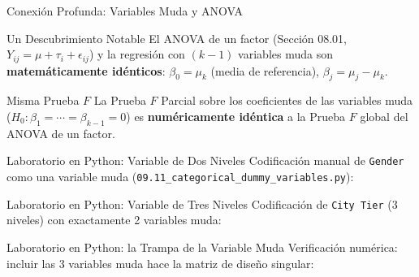 \documentclass[10pt, aspectratio=169]{beamer}
\begin{document}
\begin{frame}{Conexión Profunda: Variables Muda y ANOVA}
  \footnotesize
  \begin{block}{Un Descubrimiento Notable}
    El ANOVA de un factor (Sección 08.01, $Y_{ij}=\mu+\tau_i+\epsilon_{ij}$) y la regresión con $(k-1)$ variables muda son \textbf{matemáticamente idénticos}: $\beta_0=\mu_k$ (media de referencia), $\beta_j=\mu_j-\mu_k$.
  \end{block}
  \pause

  \vspace{0.1cm}
  \begin{alertblock}{Misma Prueba $F$}
    La Prueba $F$ Parcial sobre los coeficientes de las variables muda ($H_0:\beta_1=\cdots=\beta_{k-1}=0$) es \textbf{numéricamente idéntica} a la Prueba $F$ global del ANOVA de un factor.
  \end{alertblock}
\end{frame}

\begin{frame}[fragile]{Laboratorio en Python: Variable de Dos Niveles}
  \scriptsize
  Codificación manual de \texttt{Gender} como una variable muda (\texttt{09.11\_categorical\_dummy\_variables.py}):
  {
  }
\end{frame}

\begin{frame}[fragile]{Laboratorio en Python: Variable de Tres Niveles}
  \scriptsize
  Codificación de \texttt{City Tier} (3 niveles) con exactamente 2 variables muda:
  {
  }
\end{frame}

\begin{frame}[fragile]{Laboratorio en Python: la Trampa de la Variable Muda}
  \scriptsize
  Verificación numérica: incluir las 3 variables muda hace la matriz de diseño singular:
  {
  }
\end{frame}
\end{document}
